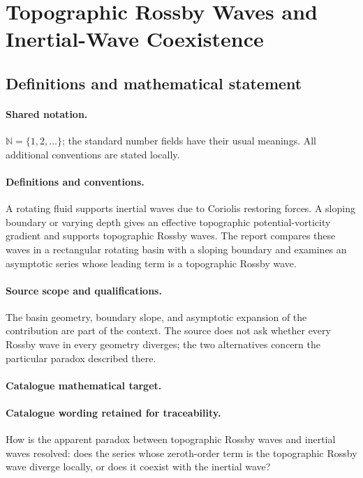\documentclass[11pt]{article}
\begin{document}
\section{Topographic Rossby Waves and Inertial-Wave Coexistence}\label{statement}

\subsection{Definitions and mathematical statement}

\paragraph{Shared notation.}$\mathbb N=\{1,2,\ldots\}$; the standard number fields have their usual meanings. All additional conventions are stated locally.


\paragraph{Definitions and conventions.} A rotating fluid supports inertial waves due to Coriolis restoring forces. A sloping boundary or varying depth gives an effective topographic potential-vorticity gradient and supports topographic Rossby waves. The report compares these waves in a rectangular rotating basin with a sloping boundary and examines an asymptotic series whose leading term is a topographic Rossby wave.

\paragraph{Source scope and qualifications.} The basin geometry, boundary slope, and asymptotic expansion of the contribution are part of the context. The source does not ask whether every Rossby wave in every geometry diverges; the two alternatives concern the particular paradox described there.

\paragraph{Catalogue mathematical target.}
\paragraph{Catalogue wording retained for traceability.}
How is the apparent paradox between topographic Rossby waves and inertial waves resolved: does the series whose zeroth-order term is the topographic Rossby wave diverge locally, or does it coexist with the inertial wave?
\end{document}
